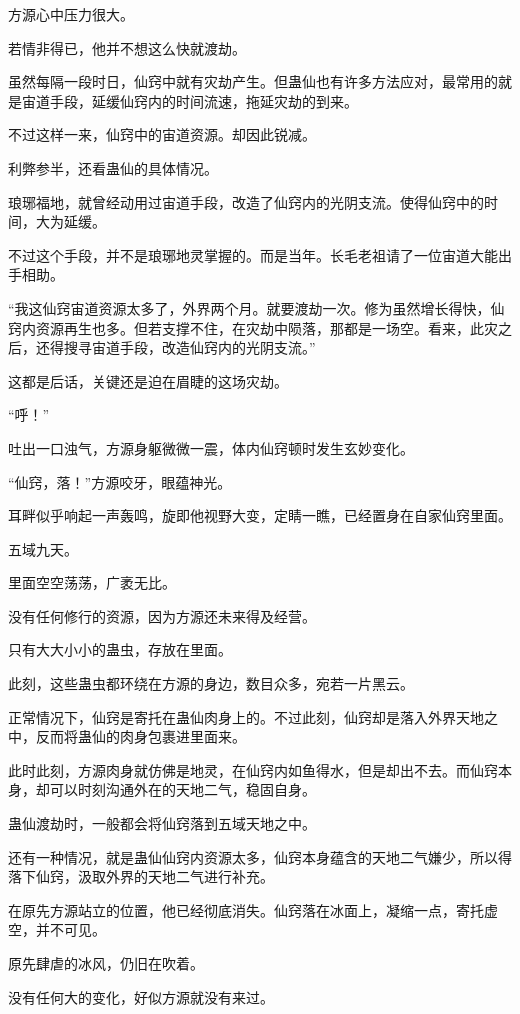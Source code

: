 \begin{this_body}
方源心中压力很大。

若情非得已，他并不想这么快就渡劫。

虽然每隔一段时日，仙窍中就有灾劫产生。但蛊仙也有许多方法应对，最常用的就是宙道手段，延缓仙窍内的时间流速，拖延灾劫的到来。

不过这样一来，仙窍中的宙道资源。却因此锐减。

利弊参半，还看蛊仙的具体情况。

琅琊福地，就曾经动用过宙道手段，改造了仙窍内的光阴支流。使得仙窍中的时间，大为延缓。

不过这个手段，并不是琅琊地灵掌握的。而是当年。长毛老祖请了一位宙道大能出手相助。

“我这仙窍宙道资源太多了，外界两个月。就要渡劫一次。修为虽然增长得快，仙窍内资源再生也多。但若支撑不住，在灾劫中陨落，那都是一场空。看来，此灾之后，还得搜寻宙道手段，改造仙窍内的光阴支流。”

这都是后话，关键还是迫在眉睫的这场灾劫。

“呼！”

吐出一口浊气，方源身躯微微一震，体内仙窍顿时发生玄妙变化。

“仙窍，落！”方源咬牙，眼蕴神光。

耳畔似乎响起一声轰鸣，旋即他视野大变，定睛一瞧，已经置身在自家仙窍里面。

五域九天。

里面空空荡荡，广袤无比。

没有任何修行的资源，因为方源还未来得及经营。

只有大大小小的蛊虫，存放在里面。

此刻，这些蛊虫都环绕在方源的身边，数目众多，宛若一片黑云。

正常情况下，仙窍是寄托在蛊仙肉身上的。不过此刻，仙窍却是落入外界天地之中，反而将蛊仙的肉身包裹进里面来。

此时此刻，方源肉身就仿佛是地灵，在仙窍内如鱼得水，但是却出不去。而仙窍本身，却可以时刻沟通外在的天地二气，稳固自身。

蛊仙渡劫时，一般都会将仙窍落到五域天地之中。

还有一种情况，就是蛊仙仙窍内资源太多，仙窍本身蕴含的天地二气嫌少，所以得落下仙窍，汲取外界的天地二气进行补充。

在原先方源站立的位置，他已经彻底消失。仙窍落在冰面上，凝缩一点，寄托虚空，并不可见。

原先肆虐的冰风，仍旧在吹着。

没有任何大的变化，好似方源就没有来过。


\end{this_body}
